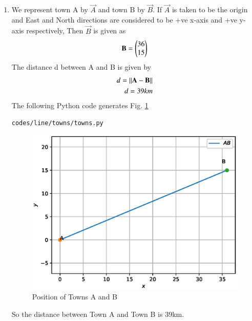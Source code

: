 \renewcommand{\theequation}{\theenumi}
\begin{enumerate}[label=\thesection.\arabic*.,ref=\thesection.\theenumi]

\item We represent town A by $\vec{A}$ and town B by $\vec{B}$.
\newline
If $\vec{A}$ is taken to be the origin and East and North directions are considered to be +ve x-axis and +ve y-axis respectively, Then $\vec{B}$ is given as
\begin{align}
\mathbf{B}=\begin{pmatrix}36\\15\end{pmatrix}
\end{align}
The distance d between A and B is given by
\begin{align}
d = \left\lVert\mathbf{A}-\mathbf{B}\right\rVert
\\
d=39km
\end{align}
 The  following Python code generates Fig. \ref{fig:towns_py}
%
\begin{lstlisting}
codes/line/towns/towns.py
\end{lstlisting}
\begin{figure}[!ht]
\centering
\includegraphics[width=\columnwidth]{./codes/line/towns/pyfigs/towns.eps}
\caption{Position of Towns A and B}
\label{fig:towns_py}
\end{figure}
So the distance between Town A and Town B is 39km.
\end{enumerate}
